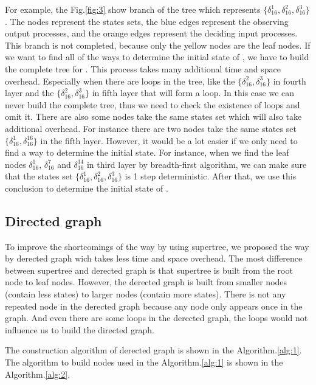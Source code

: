 For example, the Fig.\ref{fig:3} show branch of the tree which represents $\{\delta_{16}^1,\delta_{16}^2,\delta_{16}^3\}$. The nodes represent the states sets, the blue edges represent the observing output processes, and the orange edges represent the deciding input processes. This branch is not completed, because only the yellow nodes are the leaf nodes. If we want to find all of the ways to determine the initial state of \BCN, we have to build the complete tree for \BCN. This process takes many additional time and space overhead. Especially when there are loops in the tree, like the $\{\delta_{16}^2,\delta_{16}^3\}$ in fourth layer and the $\{\delta_{16}^2,\delta_{16}^3\}$ in fifth layer that will form a loop. In this case we can never build the complete tree, thus we need to check the existence of loops and omit it. There are also some nodes take the same states set which will also take additional overhead. For instance there are two nodes take the same states set $\{\delta_{16}^1,\delta_{16}^{16}\}$ in the fifth layer. However, it would be a lot easier if we only need to find a way to determine the initial state. For instance, when we find the leaf nodes $\delta_{16}^1$, $\delta_{16}^7$ and  $\delta_{16}^{14}$ in third layer by breadth-first algorithm, we can make sure that the states set $\{\delta_{16}^1,\delta_{16}^2,\delta_{16}^3\}$ is 1 step deterministic. After that, we use this conclusion to determine the initial state of \BCN. 
\subsection{Directed graph}
To improve the shortcomings of the way by using supertree, we proposed the way by derected graph wich takes less time and space overhead. The most difference between supertree and derected graph is that supertree is built from the root node to leaf nodes. However, the derected graph is built from smaller nodes (contain less states) to larger nodes (contain more states). There is not any repeated node in the derected graph because any node only appears once in the graph. And even there are some loops in the derected graph, the loops would not influence us to build the directed graph.

The construction algorithm of derected graph is shown in the Algorithm.\ref{alg:1}. The algorithm to build nodes used in the Algorithm.\ref{alg:1} is shown in the Algorithm.\ref{alg:2}.

